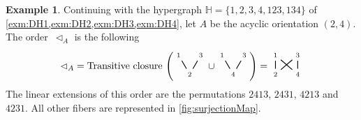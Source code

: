 \documentclass{amsart}
\theoremstyle{definition}
\newtheorem{example}[theorem]{Example}
\newcommand{\less}{\vartriangleleft} %
\newcommand{\HH}{\mathbb H}  %
\begin{document}
\begin{example}
\label{exm:DH5}
Continuing with the hypergraph $\HH=\{ 1, 2, 3, 4, 123, 134 \}$ of \cref{exm:DH1,exm:DH2,exm:DH3,exm:DH4}, let $A$ be the acyclic orientation $(2,4)$.
The order~$\less_A$ is the following
\[
	{\less_A} = \text{Transitive closure }\Bigg(
	\begin{tikzpicture}[scale=1,baseline=.2cm]
		\node (2) at (0,0) {$\scriptstyle 2$};
		\node (1) at (-.4,.7) {$\scriptstyle 1$};
		\node (3) at (.4,.7) {$\scriptstyle 3$};
		\draw [thick] (2)--(1); 
		\draw [thick] (2)--(3); 
	\end{tikzpicture} 
	\cup
	\begin{tikzpicture}[scale=1,baseline=.2cm]
		\node (4) at (0,0) {$\scriptstyle 4$};
		\node (1) at (-.4,.7) {$\scriptstyle 1$};
		\node (3) at (.4,.7) {$\scriptstyle 3$};
		\draw [thick] (4)--(1); 
		\draw [thick] (4)--(3); 
	\end{tikzpicture} 
	\Bigg)
	=
	\begin{tikzpicture}[scale=1,baseline=.2cm]
		\node (4) at (.4,0) {$\scriptstyle 4$};
		\node (2) at (-.4,0) {$\scriptstyle 2$};
		\node (1) at (-.4,.7) {$\scriptstyle 1$};
		\node (3) at (.4,.7) {$\scriptstyle 3$};
		\draw [thick] (4)--(1); 
		\draw [thick] (4)--(3); 
		\draw [thick] (2)--(1); 
		\draw [thick] (2)--(3); 
	\end{tikzpicture} 	
\]
The linear extensions of this order are the permutations $2413$, $2431$, $4213$ and $4231$.
All other fibers are represented in \cref{fig:surjectionMap}.


\end{example}
\end{document}
